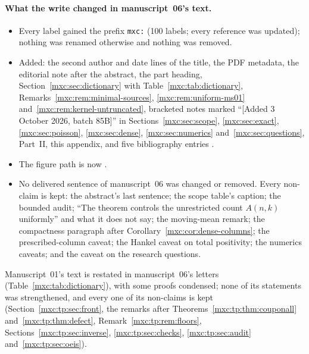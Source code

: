 \documentclass[11pt]{article}
\numberwithin{equation}{section}
\theoremstyle{definition}
\theoremstyle{remark}
\begin{document}
\paragraph{What the write changed in manuscript~06's text.}
\begin{itemize}
\item Every label gained the prefix \texttt{mxc:} (100 labels; every
 reference was updated); nothing was renamed otherwise and nothing was
 removed.
\item Added: the second author and date lines of the title, the PDF
 metadata, the editorial note after the abstract, the part heading,
 Section~\ref{mxc:sec:dictionary} with Table~\ref{mxc:tab:dictionary},
 Remarks~\ref{mxc:rem:minimal-sources}, \ref{mxc:rem:uniform-ms01}
 and~\ref{mxc:rem:kernel-untruncated}, bracketed notes marked
 ``[Added 3 October 2026, batch 85B]'' in Sections~\ref{mxc:sec:scope},
 \ref{mxc:sec:exact}, \ref{mxc:sec:poisson}, \ref{mxc:sec:dense},
 \ref{mxc:sec:numerics} and~\ref{mxc:sec:questions}, Part~II, this
 appendix, and five bibliography entries
 \cite{proveit01,pdc,tsvol,leanob,oeis784b}.
\item The figure path is now .
\item No delivered sentence of manuscript~06 was changed or removed. Every
 non-claim is kept: the abstract's last sentence; the scope table's
 caption; the bounded audit; ``The theorem controls the unrestricted count
 $A(n,k)$ uniformly'' and what it does not say; the moving-mean remark;
 the compactness paragraph after Corollary~\ref{mxc:cor:dense-columns};
 the prescribed-column caveat; the Hankel caveat on total positivity; the
 numerics caveats; and the caveat on the research questions.
\end{itemize}
Manuscript~01's text is restated in manuscript~06's letters
(Table~\ref{mxc:tab:dictionary}), with some proofs condensed; none of its
statements was strengthened, and every one of its non-claims is kept
(Section~\ref{mxc:tp:sec:front}, the remarks after
Theorems~\ref{mxc:tp:thm:couponall} and~\ref{mxc:tp:thm:defect},
Remark~\ref{mxc:tp:rem:floors}, Sections~\ref{mxc:tp:sec:inverse},
\ref{mxc:tp:sec:checks}, \ref{mxc:tp:sec:audit} and~\ref{mxc:tp:sec:oeis}).
\end{document}
